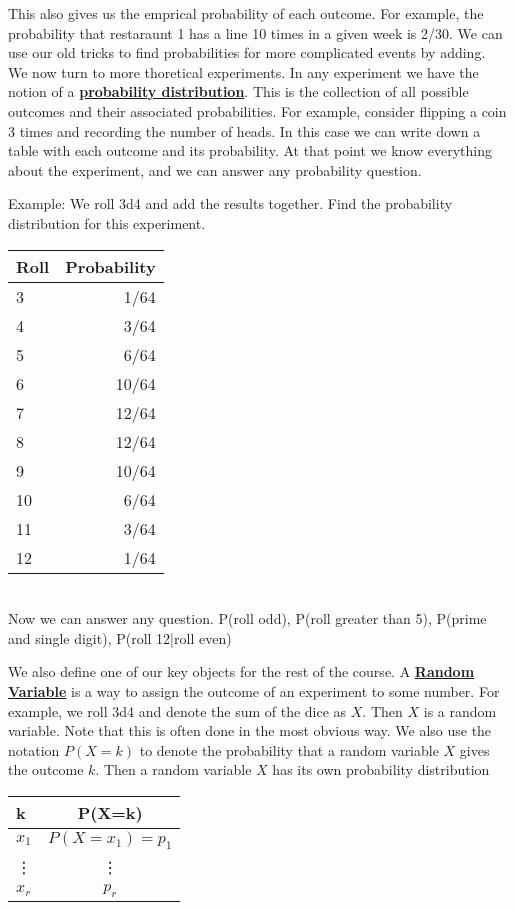 \documentclass[14,fleqn]{article}
\newcommand{\defn}[1]{\textbf{\underline{#1}}}
\begin{document}
This also gives us the emprical probability of each outcome. For example, the probability that restaraunt 1 has a line 10 times in a given week is 2/30. We can use our old tricks to find probabilities for more complicated events by adding.\\

We now turn to more thoretical experiments. In any experiment we have the notion of a \defn{probability distribution}. This is the collection of all possible outcomes and their associated probabilities. For example, consider flipping a coin 3 times and recording the number of heads. In this case we can write down a table with each outcome and its probability. At that point we know everything about the experiment, and we can answer any probability question.

Example: We roll 3d4 and add the results together. Find the probability distribution for this experiment.\\
\begin{tabular}{l|r}
	Roll&Probability\\\hline
	3&1/64\\\hline
	4&3/64\\\hline
	5&6/64\\\hline
	6&10/64\\\hline
	7&12/64\\\hline
	8&12/64\\\hline
	9&10/64\\\hline
	10&6/64\\\hline
	11&3/64\\\hline
	12&1/64\\\hline
\end{tabular}\\
Now we can answer any question. P(roll odd), P(roll greater than 5), P(prime and single digit), P(roll 12|roll even)

We also define one of our key objects for the rest of the course. A \defn{Random Variable} is a way to assign the outcome of an experiment to some number. For example, we roll 3d4 and denote the sum of the dice as $X.$ Then $X$ is a random variable. Note that this is often done in the most obvious way. We also use the notation $P(X=k)$ to denote the probability that a random variable $X$ gives the outcome $k.$ Then a random variable $X$ has its own probability distribution\\
\begin{tabular}{l|c}
	k&P(X=k)\\\hline
	$x_1$&$P(X=x_1)=p_1$\\
	\vdots&\vdots\\
$x_r$&$p_r$\\
\end{tabular}\\
\end{document}
